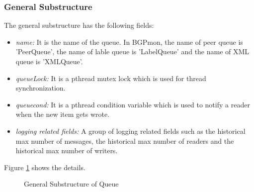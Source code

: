 \subsubsection{\label{sub:queue:struct:general}{General Substructure}}
The general substructure has the following fields:
\begin{itemize}
	\item{\emph{name:} It is the name of the queue. In BGPmon, the name of peer queue is 'PeerQueue', the name of lable queue is 'LabelQueue' and the name of XML queue is 'XMLQueue'. }
	\item{\emph{ queueLock:} It is a pthread mutex lock which is used for thread synchronization.}
	\item{\emph{ queuecond:} It is a pthread condition variable which is used to notify a reader when the new item gets wrote.}
	\item{\emph{ logging related fields:} A group of logging related fields such as the historical max number of messages, the historical max number of readers and the historical max number of writers.}
	\end{itemize}
Figure \ref{fig:queue:struct:general} shows the details.
\begin{figure}
\centering
{}
\caption{ General Substructure of Queue}
\label{fig:queue:struct:general}
\end{figure}
	 

